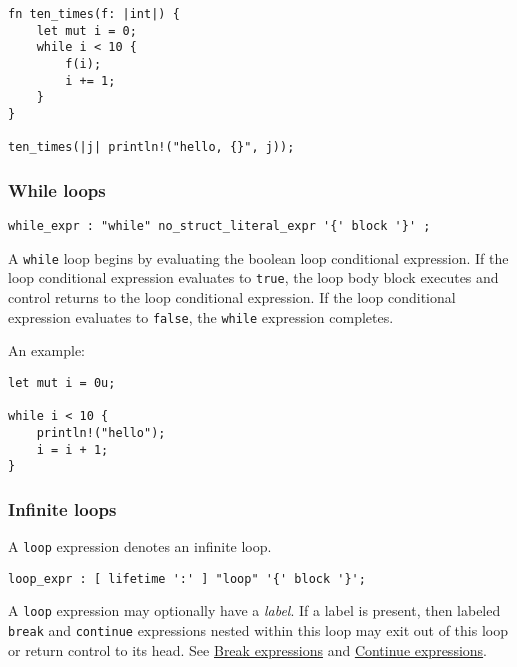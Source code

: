 \documentclass[]{article}
\begin{document}
\begin{verbatim}
fn ten_times(f: |int|) {
    let mut i = 0;
    while i < 10 {
        f(i);
        i += 1;
    }
}

ten_times(|j| println!("hello, {}", j));
\end{verbatim}

\subsubsection{While loops}\label{while-loops}

\begin{verbatim}
while_expr : "while" no_struct_literal_expr '{' block '}' ;
\end{verbatim}

A \texttt{while} loop begins by evaluating the boolean loop conditional
expression. If the loop conditional expression evaluates to
\texttt{true}, the loop body block executes and control returns to the
loop conditional expression. If the loop conditional expression
evaluates to \texttt{false}, the \texttt{while} expression completes.

An example:

\begin{verbatim}
let mut i = 0u;

while i < 10 {
    println!("hello");
    i = i + 1;
}
\end{verbatim}

\subsubsection{Infinite loops}\label{infinite-loops}

A \texttt{loop} expression denotes an infinite loop.

\begin{verbatim}
loop_expr : [ lifetime ':' ] "loop" '{' block '}';
\end{verbatim}

A \texttt{loop} expression may optionally have a \emph{label}. If a
label is present, then labeled \texttt{break} and \texttt{continue}
expressions nested within this loop may exit out of this loop or return
control to its head. See \hyperref[break-expressions]{Break expressions}
and \hyperref[continue-expressions]{Continue expressions}.

\end{document}
